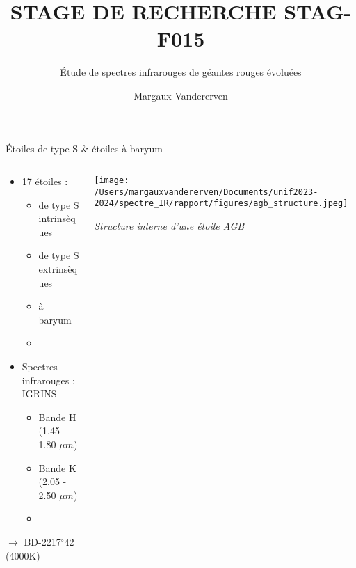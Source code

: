 \documentclass[10pt]{beamer}
\title{STAGE DE RECHERCHE STAG-F015}
\subtitle{Étude de spectres infrarouges de géantes rouges évoluées}
\date{}
\author{\small Margaux Vandererven}
\institute{\small Supervisé par Sophie Van Eck}
\newcommand{\themename}{\textbf{\textsc{metropolis}}\xspace}
\begin{document}
\maketitle

\begin{frame}[fragile]{Étoiles de type S \& étoiles à baryum}




\begin{columns}
        \begin{column}{0.5\textwidth}
            \begin{itemize}
                \item 17 étoiles : 
					\begin{itemize}
						\item[\circ] de type S intrinsèques
						\item[\circ] de type S extrinsèques
						\item[\circ] à baryum
						\item[] 
					\end{itemize} 
				\item Spectres infrarouges : IGRINS 
					\begin{itemize}
						\item[\circ] Bande H (1.45 - 1.80 $\mu m$)
						\item[\circ] Bande K (2.05 - 2.50 $\mu m$)
						\item[]
					\end{itemize}
            \end{itemize} 

		$\rightarrow$ BD-2217$^{\circ}$42 (4000K)
        \end{column}
        \begin{column}{0.5\textwidth}
            \centering
            \texttt{[image: /Users/margauxvandererven/Documents/unif2023-2024/spectre\_IR/rapport/figures/agb\_structure.jpeg]}
			\caption{\textit{Structure interne d'une étoile AGB}}
        \end{column}
    \end{columns}





%
%
%
\end{frame}
\end{document}
